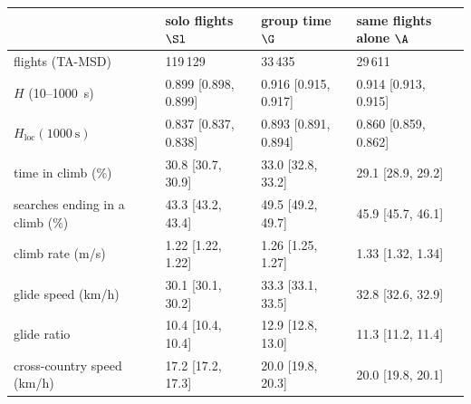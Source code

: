 \begin{tabular}{@{}l l l l@{}}
\toprule
 & solo flights $\Sl$ & group time $\G$ & same flights alone $\A$ \\
\midrule
flights (TA-MSD) & 119\,129 & 33\,435 & 29\,611 \\
$H$ (10--1000~s) & 0.899 [0.898, 0.899] & 0.916 [0.915, 0.917] & 0.914 [0.913, 0.915] \\
$H_\mathrm{loc}(1000~\mathrm{s})$ & 0.837 [0.837, 0.838] & 0.893 [0.891, 0.894] & 0.860 [0.859, 0.862] \\
time in climb (\%) & 30.8 [30.7, 30.9] & 33.0 [32.8, 33.2] & 29.1 [28.9, 29.2] \\
searches ending in a climb (\%) & 43.3 [43.2, 43.4] & 49.5 [49.2, 49.7] & 45.9 [45.7, 46.1] \\
climb rate (m/s) & 1.22 [1.22, 1.22] & 1.26 [1.25, 1.27] & 1.33 [1.32, 1.34] \\
glide speed (km/h) & 30.1 [30.1, 30.2] & 33.3 [33.1, 33.5] & 32.8 [32.6, 32.9] \\
glide ratio & 10.4 [10.4, 10.4] & 12.9 [12.8, 13.0] & 11.3 [11.2, 11.4] \\
cross-country speed (km/h) & 17.2 [17.2, 17.3] & 20.0 [19.8, 20.3] & 20.0 [19.8, 20.1] \\
\bottomrule
\end{tabular}
